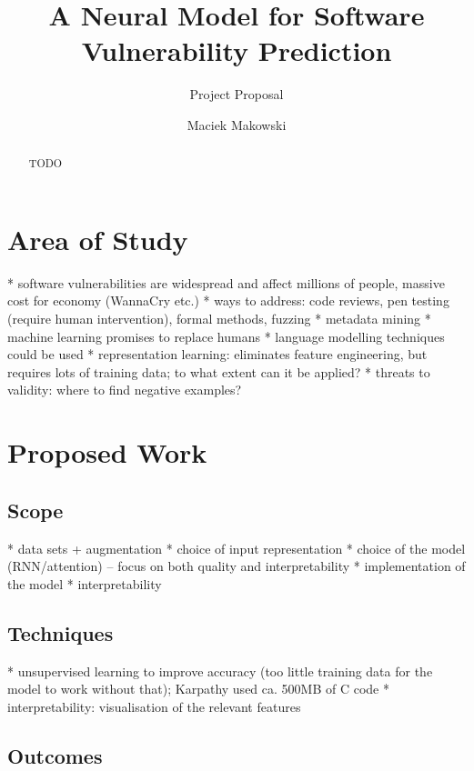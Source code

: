 \documentclass[twoside,a4paper]{scrartcl}
\begin{document}
\title{A Neural Model for Software Vulnerability Prediction}
\subtitle{Project Proposal} 
\author{Maciek Makowski}
\maketitle

\begin{abstract}
TODO
\end{abstract}

\section{Area of Study}

* software vulnerabilities are widespread and affect millions of people, massive cost for economy (WannaCry etc.)
* ways to address: code reviews, pen testing (require human intervention), formal methods, fuzzing\cite{neville2016towards}
* metadata mining\cite{shin2011evaluating}
* machine learning promises to replace humans\cite{scandariato2014predicting}
* language modelling techniques could be used\cite{karpathy2015unreasonable}
* representation learning: eliminates feature engineering, but requires lots of training data;
to what extent can it be applied?
* threats to validity: where to find negative examples?

\section{Proposed Work}

\subsection{Scope}

* data sets + augmentation
* choice of input representation
* choice of the model (RNN/attention) -- focus on both quality and interpretability
* implementation of the model
* interpretability

\subsection{Techniques}

* unsupervised learning to improve accuracy (too little training data for the model to
  work without that); Karpathy used ca. 500MB of C code
* interpretability: visualisation of the relevant features

\subsection{Outcomes}
\end{document}
